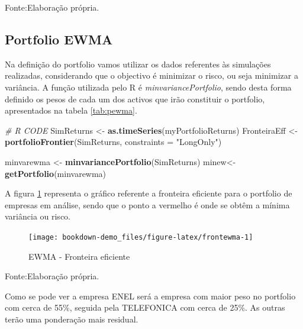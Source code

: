 \documentclass[
  12pt,
  a4paper,
  openany]{book}
\newenvironment{Shaded}{\begin{snugshade}}{\end{snugshade}}
\newcommand{\CommentTok}[1]{\textcolor[rgb]{0.56,0.35,0.01}{\textit{#1}}}
\newcommand{\DataTypeTok}[1]{\textcolor[rgb]{0.13,0.29,0.53}{#1}}
\newcommand{\KeywordTok}[1]{\textcolor[rgb]{0.13,0.29,0.53}{\textbf{#1}}}
\newcommand{\NormalTok}[1]{#1}
\newcommand{\StringTok}[1]{\textcolor[rgb]{0.31,0.60,0.02}{#1}}
\begin{document}
Fonte:Elaboração própria.

\justifying
\bigskip

\hypertarget{portfolio-ewma}{%
\subsection{Portfolio EWMA}\label{portfolio-ewma}}

Na definição do portfolio vamos utilizar os dados referentes às simulações realizadas, considerando que o objectivo é minimizar o risco, ou seja minimizar a variância. A função utilizada pelo R é \emph{minvariancePortfolio}, sendo desta forma definido os pesos de cada um dos activos que irão constituir o portfolio, apresentados na tabela \ref{tab:pewma}.

\scriptsize

\begin{Shaded}
\begin{Highlighting}[]
\CommentTok{\# R CODE}
\NormalTok{SimReturns \textless{}{-}}\StringTok{ }\KeywordTok{as.timeSeries}\NormalTok{(myPortfolioReturns)}
\NormalTok{FronteiraEff \textless{}{-}}\StringTok{ }\KeywordTok{portfolioFrontier}\NormalTok{(SimReturns, }\DataTypeTok{constraints =} \StringTok{"LongOnly"}\NormalTok{)}

\NormalTok{minvarewma \textless{}{-}}\StringTok{ }\KeywordTok{minvariancePortfolio}\NormalTok{(SimReturns) }
\NormalTok{minew\textless{}{-}}\KeywordTok{getPortfolio}\NormalTok{(minvarewma)}
\end{Highlighting}
\end{Shaded}

\normalsize

A figura \ref{fig:frontewma} representa o gráfico referente a fronteira eficiente para o portfolio de empresas em análise, sendo que o ponto a vermelho é onde se obtêm a mínima variância ou risco.

\begin{figure}

{\centering \texttt{[image: bookdown-demo\_files/figure-latex/frontewma-1]} 

}

\caption{EWMA - Fronteira eficiente}\label{fig:frontewma}
\end{figure}
\FloatBarrier
\centering

Fonte:Elaboração própria.

\justifying
\bigskip

Como se pode ver a empresa ENEL será a empresa com maior peso no portfolio com cerca de 55\%, seguida pela TELEFONICA com cerca de 25\%. As outras terão uma ponderação mais residual.
\end{document}
